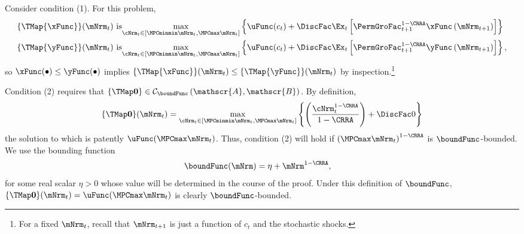\documentclass[\econtexRoot/BufferStockTheory]{subfiles}
\begin{document}
Consider condition (1). For this problem,
\begin{align*}
  \{\TMap{\mathfrak{\xFunc}}\}(\mNrm_{t}) &\mbox{~is}\underset{\cNrm_{t} \in
                                            [\MPCminmin \mNrm_{t}, \MPCmax \mNrm_{t}]
                                            }\max \left\{
                                            \uFunc(c_{t})+\DiscFac \Ex_{t}\left[ {\PermGroFac}_{t+1}^{1-\CRRA }{\mathfrak{\xFunc}}
                                            \left( {\mNrm}_{t+1}\right) \right] \right\}  \notag  \label{eq:condition1}
  \\
  \{\TMap{\mathfrak{\yFunc}}\}(\mNrm_{t}) &\mbox{~is}\underset{\cNrm_{t} \in
                                            [\MPCminmin \mNrm_{t}, \MPCmax \mNrm_{t}]
                                            }\max \left\{
                                            \uFunc(c_{t})+\DiscFac \Ex_{t}\left[ {\PermGroFac}_{t+1}^{1-\CRRA }{\mathfrak{\yFunc}}
                                            \left( {\mNrm}_{t+1}\right) \right] \right\} ,  \notag
\end{align*}%
so ${\mathfrak{\xFunc}}(\bullet) \leq {\mathfrak{\yFunc}}(\bullet)$ implies $\{\TMap{\mathfrak{\xFunc}}\}(\mNrm_{t}) \leq \{\TMap{\mathfrak{\yFunc}} \}(\mNrm_{t})$ by inspection.\footnote{For a fixed $\mNrm_{t}$, recall that ${\mNrm}_{t+1}$ is just a function of $c_{t}$ and the
  stochastic shocks.}

Condition (2) requires that $\{\TMap\mathbf{0}\}\in \mathcal{C}_{\boundFunc}\left(\mathscr{A},\mathscr{B}\right)$. By definition,
\begin{equation*}
  \{\TMap \mathbf{0}\}(\mNrm_{t}) = \max_{\cNrm_{t} \in
    [\MPCminmin \mNrm_{t}, \MPCmax \mNrm_{t}]
  }\left\{ \left( \frac{\cNrm_{t}^{1-\CRRA }}{1-\CRRA }\right) +\DiscFac 0\right\}
\end{equation*}
the solution to which is patently
$\uFunc(\MPCmax \mNrm_{t})$. Thus, condition (2)
will hold if ${(\MPCmax \mNrm_{t})}^{1-\CRRA}$ is $\boundFunc$-bounded.  We use
the bounding function
\begin{equation}\begin{gathered}\begin{aligned}
      \label{eq:boundFunc}
      \boundFunc(\mNrm)  & = \eta + \mNrm^{1-\CRRA},
    \end{aligned}\end{gathered}\end{equation}
for some real scalar $\eta > 0$ whose value will be determined in the
course of the proof. Under this definition of $\boundFunc$,
$\{\TMap\mathbf{0}\}(\mNrm_{t})= \uFunc(\MPCmax \mNrm_{t})$
is clearly
$\boundFunc$-bounded.
\end{document}
